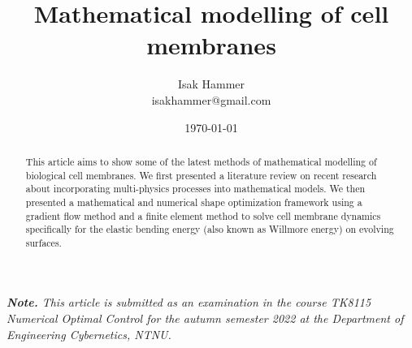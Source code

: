 \documentclass[10pt,conference]{IEEEtran}
\title{ {\Large \textbf{Mathematical modelling of cell membranes }} }
\date{\today}
\begin{document}
\author{
Isak Hammer \\
\small{isakhammer@gmail.com}
}

\maketitle
\begin{sloppy}
\textit{ \textbf{Note.} This article is submitted as an examination in the course TK8115 Numerical Optimal Control for the autumn semester 2022 at the Department of Engineering Cybernetics, NTNU. \\}


\begin{abstract}
This article aims to show some of the latest methods of mathematical modelling of biological cell membranes. We first presented a literature review on recent research about incorporating multi-physics processes into mathematical models. We then presented a
mathematical and numerical shape optimization framework using a gradient flow method and
a finite element method to solve cell membrane dynamics specifically for the elastic bending energy (also known as Willmore energy) on evolving surfaces.
\end{abstract}

    
    
    
    
    

    \printbibliography
\end{sloppy}
\end{document}
